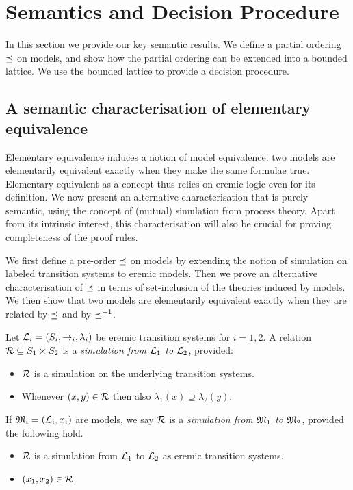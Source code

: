 \section{Semantics and Decision Procedure}

In this section we provide our key semantic results. 
We define a partial ordering $\preceq$ on models, and show how the partial ordering can be extended into a bounded lattice.
We use the bounded lattice to provide a decision procedure.

\subsection{A semantic characterisation of elementary equivalence}\label{elementaryEquivalence}

Elementary equivalence induces a notion of model equivalence: two
models are elementarily equivalent exactly when they make the same
formulae true. Elementary equivalent as a concept thus relies on
eremic logic even for its definition. We now present an alternative
characterisation that is purely semantic, using the concept of
(mutual) simulation from process theory. Apart from its intrinsic
interest, this characterisation will also be crucial for proving
completeness of the proof rules.

We first define a pre-order $\preceq$ on models by extending the
notion of simulation on labeled transition systems to eremic
models. Then we prove an alternative characterisation of $\preceq$
in terms of set-inclusion of the theories induced by models. We then
show that two models are elementarily equivalent exactly when they are
related by $\preceq$ and by $\preceq^{-1}$.

\begin{definition}
Let $\mathcal{L}_i = (S_i, \rightarrow_i, \lambda_i)$ be eremic transition
systems for $i = 1, 2$.  A relation $\mathcal{R} \subseteq S_1 \times S_2$ is
a \emph{simulation from $\mathcal{L}_1$ to $\mathcal{L}_2$}, provided:
\begin{itemize} 

\item $\mathcal{R}$ is a simulation on the underlying transition systems. 

\item Whenever $(x, y) \in \mathcal{R}$ then also $\lambda_1(x) \supseteq
  \lambda_2(y)$.

\end{itemize}

\NI If $\frak{M}_i = (\mathcal{L}_i, x_i)$ are models, we say $\mathcal{R}$ is a
\emph{simulation from $\frak{M}_1$ to $\frak{M}_2$}, provided the following hold.

\begin{itemize}

\item $\mathcal{R}$ is a simulation from $\mathcal{L}_1$ to $\mathcal{L}_2$ as eremic transition systems.

\item  $(x_1, x_2) \in \mathcal{R}$. 

\end{itemize}

\end{definition}

